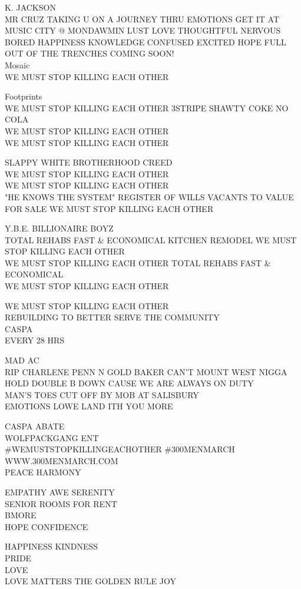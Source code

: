 \documentclass[10pt,letterpaper]{article}
\begin{document}
K. JACKSON\\
MR CRUZ TAKING U ON A JOURNEY THRU EMOTIONS GET IT AT MUSIC CITY @ MONDAWMIN LUST LOVE THOUGHTFUL NERVOUS BORED HAPPINESS KNOWLEDGE CONFUSED EXCITED HOPE FULL OUT OF THE TRENCHES COMING SOON!\\
Mosaic\\
WE MUST STOP KILLING EACH OTHER

Footprints\\
WE MUST STOP KILLING EACH OTHER 3STRIPE SHAWTY COKE NO COLA\\
WE MUST STOP KILLING EACH OTHER\\
WE MUST STOP KILLING EACH OTHER

SLAPPY WHITE BROTHERHOOD CREED\\
WE MUST STOP KILLING EACH OTHER\\
WE MUST STOP KILLING EACH OTHER\\
"HE KNOWS THE SYSTEM" REGISTER OF WILLS VACANTS TO VALUE FOR SALE WE MUST STOP KILLING EACH OTHER

Y.B.E. BILLIONAIRE BOYZ\\
TOTAL REHABS FAST \& ECONOMICAL KITCHEN REMODEL WE MUST STOP KILLING EACH OTHER\\
WE MUST STOP KILLING EACH OTHER TOTAL REHABS FAST \& ECONOMICAL\\
WE MUST STOP KILLING EACH OTHER

WE MUST STOP KILLING EACH OTHER\\
REBUILDING TO BETTER SERVE THE COMMUNITY\\
CASPA\\
EVERY 28 HRS

MAD AC\\
RIP CHARLENE PENN N GOLD BAKER CAN'T MOUNT WEST NIGGA HOLD DOUBLE B DOWN CAUSE WE ARE ALWAYS ON DUTY\\
MAN'S TOES CUT OFF BY MOB AT SALISBURY\\
EMOTIONS LOWE LAND ITH YOU MORE

CASPA ABATE\\
WOLFPACKGANG ENT\\
\#WEMUSTSTOPKILLINGEACHOTHER \#300MENMARCH WWW.300MENMARCH.COM\\
PEACE HARMONY

EMPATHY AWE SERENITY\\
SENIOR ROOMS FOR RENT\\
BMORE\\
HOPE CONFIDENCE

HAPPINESS KINDNESS\\
PRIDE\\
LOVE\\
LOVE MATTERS THE GOLDEN RULE JOY
\end{document}
